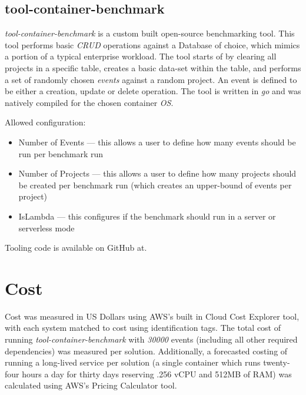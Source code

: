 \subsection{tool-container-benchmark}
\textit{tool-container-benchmark} is a custom built open-source benchmarking tool. This tool performs basic \emph{CRUD} operations against a Database of choice,
which mimics a portion of a typical enterprise workload. The tool starts of by clearing all projects in a specific table, creates a basic data-set within the table,
and performs a set of randomly chosen \textit{events} against a random project. An event is defined to be either a creation, update or delete operation.
The tool is written in \emph{go}\cite{go} and was natively compiled for the chosen container \emph{OS}. 

Allowed configuration:
\begin{itemize}
  \item Number of Events --- this allows a user to define how many events should be run per benchmark run
  \item Number of Projects --- this allows a user to define how many projects should be created per benchmark run (which creates an upper-bound of events per project)
  \item IsLambda --- this configures if the benchmark should run in a server or serverless mode
\end{itemize}

Tooling code is available on GitHub at\cite{tool_container_benchmark}.

\section{Cost}
Cost was measured in US Dollars using AWS's built in Cloud Cost Explorer tool\cite{blocher_juras_smith_2022}, with each system matched to cost using identification tags.
The total cost of running \textit{tool-container-benchmark} with \textit{30000} events (including all other required dependencies)
was measured per solution.
Additionally, a forecasted costing of running a long-lived service per solution (a single container which runs twenty-four hours a day for thirty days reserving .256 vCPU and 512MB of RAM)
was calculated using AWS's Pricing Calculator\cite{venning_2020} tool.

